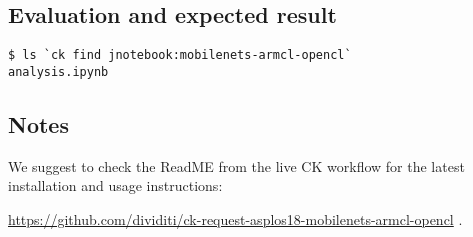 \subsection{Evaluation and expected result}

\begin{verbatim}
$ ls `ck find jnotebook:mobilenets-armcl-opencl`
analysis.ipynb
\end{verbatim}

\subsection{Notes}

We suggest to check the ReadME from the live CK workflow 
for the latest installation and usage instructions: 

\url{https://github.com/dividiti/ck-request-asplos18-mobilenets-armcl-opencl} .
